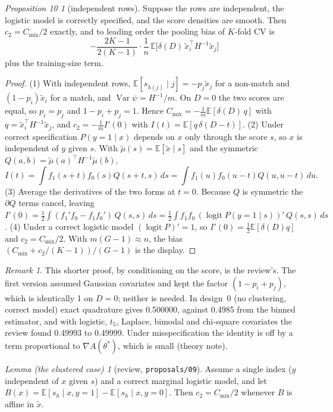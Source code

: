 \documentclass[11pt]{amsart}
\theoremstyle{plain}
\theoremstyle{definition}
\theoremstyle{remark}
\newtheorem*{rem}{Remark}
\newcommand{\Var}{\operatorname{Var}}
\newcommand{\E}{\mathbb{E}}
\newcommand{\Cmix}{C_{\mathrm{mix}}}
\newtheorem*{prop10}{Proposition 10}
\newtheorem*{lemclus}{Lemma (the clustered case)}
\begin{document}
\begin{prop10}[independent rows]
Suppose the rows are independent, the logistic model is correctly specified, and the score densities are smooth. Then $c_2=\Cmix/2$ exactly, and to leading order the pooling bias of $K$-fold CV is
\[
-\frac{2K-1}{2(K-1)}\cdot\frac1n\,\E\bigl[\delta(D)\,\tilde x_i^\top H^{-1}\tilde x_j\bigr]
\]
plus the training-size term.
\end{prop10}

\begin{proof}
(1) With independent rows, $\E[s_{h(j)}\mid j]=-p_j\tilde x_j$ for a non-match and $(1-p_i)\tilde x_i$ for a match, and $\Var\psi=H^{-1}/m$. On $D=0$ the two scores are equal, so $p_i=p_j$ and $1-p_i+p_j=1$. Hence $\Cmix=-\frac1m\E[\delta(D)\,q]$ with $q=\tilde x_i^\top H^{-1}\tilde x_j$, and $c_2=-\frac1mI'(0)$ with $I(t)=\E[q\,\delta(D-t)]$. (2) Under correct specification $P(y=1\mid x)$ depends on $x$ only through the score $s$, so $x$ is independent of $y$ given $s$. With $\tilde\mu(s)=\E[\tilde x\mid s]$ and the symmetric $Q(a,b)=\tilde\mu(a)^\top H^{-1}\tilde\mu(b)$,
\[
I(t)=\int f_1(s+t)f_0(s)Q(s+t,s)\,ds=\int f_1(u)f_0(u-t)Q(u,u-t)\,du .
\]
(3) Average the derivatives of the two forms at $t=0$. Because $Q$ is symmetric the $\partial Q$ terms cancel, leaving $I'(0)=\tfrac12\int(f_1'f_0-f_1f_0')\,Q(s,s)\,ds=\tfrac12\int f_1f_0\,(\operatorname{logit}P(y=1\mid s))'\,Q(s,s)\,ds$. (4) Under a correct logistic model $(\operatorname{logit}P)'=1$, so $I'(0)=\tfrac12\E[\delta(D)q]$ and $c_2=\Cmix/2$. With $m(G-1)\approx n$, the bias $(\Cmix+c_2/(K-1))/(G-1)$ is the display.
\end{proof}

\begin{rem}
This shorter proof, by conditioning on the score, is the review's. The first version assumed Gaussian covariates and kept the factor $(1-p_i+p_j)$, which is identically 1 on $D=0$; neither is needed. In design~0 (no clustering, correct model) exact quadrature gives 0.500000, against 0.4985 from the binned estimator, and with logistic, $t_5$, Laplace, bimodal and chi-square covariates the review found 0.49993 to 0.49999. Under misspecification the identity is off by a term proportional to $\nabla A(\theta^*)$, which is small (theory note).
\end{rem}

\begin{lemclus}[review, \texttt{proposals/09}]
Assume a single index ($y$ independent of $x$ given $s$) and a correct marginal logistic model, and let $B(x)=\E[s_h\mid x,y=1]-\E[s_h\mid x,y=0]$. Then $c_2=\Cmix/2$ whenever $B$ is affine in $\tilde x$.
\end{lemclus}
\end{document}
